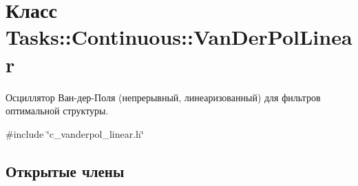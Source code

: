 \hypertarget{class_tasks_1_1_continuous_1_1_van_der_pol_linear}{}\section{Класс Tasks\+:\+:Continuous\+:\+:Van\+Der\+Pol\+Linear}
\label{class_tasks_1_1_continuous_1_1_van_der_pol_linear}


Осциллятор Ван-\/дер-\/Поля (непрерывный, линеаризованный) для фильтров оптимальной структуры.  




{\ttfamily \#include \char`\"{}c\+\_\+vanderpol\+\_\+linear.\+h\char`\"{}}

\subsection*{Открытые члены}
